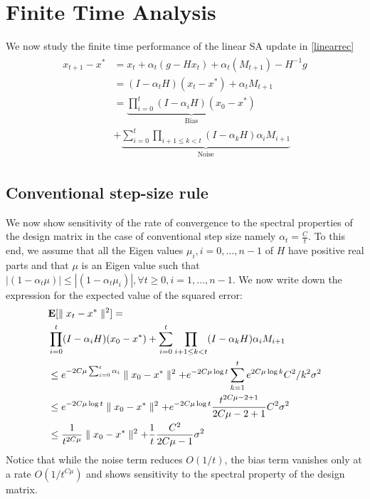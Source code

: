 \section{Finite Time Analysis}
We now study the finite time performance of the linear SA update in \eqref{linearrec}
\begin{align*}
\begin{split}
x_{t+1}-x^*
&=x_t+\alpha_t(g-Hx_t)+\alpha_t(M_{t+1})-H^{-1}g\\
&=(I-\alpha_t H)(x_t-x^*)+\alpha_t M_{t+1}\\
&=\underbrace{\prod_{i=0}^t(I-\alpha_i H)(x_0-x^*)}_{\text{Bias}}\\&+\underbrace{\sum_{i=0}^t \prod_{i+1\leq k<t} (I-\alpha_{k}H)\alpha_i M_{i+1}}_{\text{Noise}}
\end{split}
\end{align*}
\subsection{Conventional step-size rule}
We now show sensitivity of the rate of convergence to the spectral properties of the design matrix in the case of conventional step size namely $\alpha_t=\frac{C}{t}$. To this end, we assume that all the Eigen values $\mu_i, i=0,\ldots,n-1$ of $H$ have positive real parts and that $\mu$ is an Eigen value such that $|(1-\alpha_t\mu)|\leq |(1-\alpha_t\mu_i)|,\forall t\geq 0, i=1,\ldots,n-1$. We now write down the expression for the expected value of the squared error:
\begin{align}
\begin{split}
&\mathbf{E}[\parallel x_t-x^*\parallel^2]=\\
&\prod_{i=0}^t(I-\alpha_i H)(x_0-x^*)+\sum_{i=0}^t \prod_{i+1\leq k<t} (I-\alpha_{k}H)\alpha_i M_{i+1}\\
&\leq e^{-2C\mu\sum_{i=0}^t\alpha_i}\parallel x_0-x^*\parallel^2+e^{-2C\mu \log t}\sum_{k=1}^t e^{2C\mu\log k}C^2/k^2 \sigma^2\\
&\leq e^{-2C\mu\log t}\parallel x_0-x^*\parallel^2+e^{-2C\mu\log t} \frac{t^{2C\mu-2+1}}{2C\mu-2+1}C^2\sigma^2\\
&\leq  \frac{1}{t^{2C\mu}}\parallel x_0-x^*\parallel^2+\frac{1}{t}\frac{C^2}{2C\mu-1}\sigma^2\\
\end{split}
\end{align}
Notice that while the noise term reduces $O(1/t)$, the bias term vanishes only at a rate $O(1/t^{C\mu})$ and shows sensitivity to the spectral property of the design matrix.

